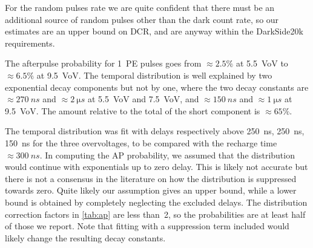 For the random pulses rate we are quite confident that there must be an
additional source of random pulses other than the dark count rate, so our
estimates are an upper bound on DCR, and are anyway within the DarkSide20k
requirements.


The afterpulse probability for 1~PE pulses goes from $\approx\SI{2.5}\%$ at
\SI{5.5}{VoV} to $\approx\SI{6.5}\%$ at \SI{9.5}{VoV}. The temporal
distribution is well explained by two exponential decay components but not by
one, where the two decay constants are $\approx\SI{270}{ns}$ and
$\approx\SI{2}{\micro s}$ at \SI{5.5}{VoV} and \SI{7.5}{VoV}, and
$\approx\SI{150}{ns}$ and $\approx\SI{1}{\micro s}$ at \SI{9.5}{VoV}. The
amount relative to the total of the short component is $\approx\SI{65}\%$.

The temporal distribution was fit with delays respectively above \SI{250}{ns},
\SI{250}{ns}, \SI{150}{ns} for the three overvoltages, to be compared with the
recharge time $\approx\SI{300}{ns}$. In computing the AP probability, we
assumed that the distribution would continue with exponentials up to zero
delay. This is likely not accurate but there is not a consensus in the
literature on how the distribution is suppressed towards zero. Quite likely our
assumption gives an upper bound, while a lower bound is obtained by completely
neglecting the excluded delays. The distribution correction factors in
\autoref{tab:ap} are less than~2, so the probabilities are at least half of
those we report. Note that fitting with a suppression term included would
likely change the resulting decay constants.

